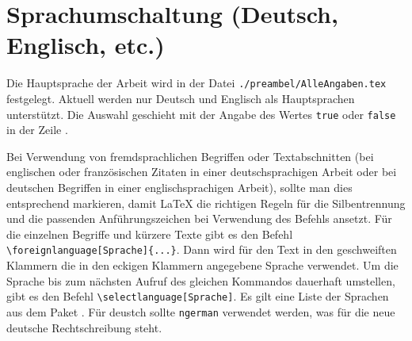 \section{Sprachumschaltung (Deutsch, Englisch, etc.)}%
%
%
%
\label{sec:Sprache}
%
Die Hauptsprache der Arbeit wird in der Datei \texttt{./preambel/AlleAngaben.tex} festgelegt.
Aktuell werden nur Deutsch und Englisch als Hauptsprachen unterstützt.
Die Auswahl geschieht mit der Angabe des Wertes \texttt{true} oder \texttt{false}
in der Zeile .

Bei Verwendung von fremdsprachlichen Begriffen oder Textabschnitten
(\zB bei englischen oder französischen Zitaten in einer deutschsprachigen Arbeit
oder bei deutschen Begriffen in einer englischsprachigen Arbeit),
sollte man dies entsprechend markieren,
damit \LaTeX{} die richtigen Regeln für die Silbentrennung
und die passenden Anführungszeichen bei Verwendung des Befehls
 ansetzt.
Für die einzelnen Begriffe und kürzere Texte gibt es den Befehl
\verb+\foreignlanguage[Sprache]{...}+.
Dann wird für den Text in den geschweiften Klammern die in den eckigen Klammern angegebene Sprache verwendet.
Um die Sprache bis zum nächsten Aufruf des gleichen Kommandos dauerhaft umstellen,
gibt es den Befehl \verb+\selectlanguage[Sprache]+.
Es gilt eine Liste der Sprachen aus dem Paket .
Für deustch sollte \texttt{ngerman} verwendet werden, was für die
neue deutsche Rechtschreibung steht.
